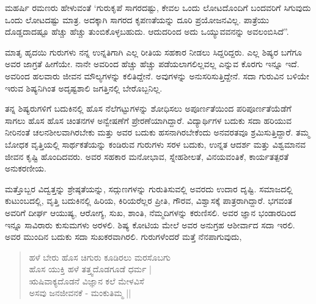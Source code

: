 ಮಹರ್ಷಿ ರಮಣರು ಹೇಳುವಂತೆ ‘ಗುರುಕೃಪೆ ಸಾಗರದಷ್ಟು, ಕೇವಲ ಒಂದು ಲೋಟದೊಂದಿಗೆ ಬಂದವರಿಗೆ ಸಿಗುವುದು ಒಂದು ಲೋಟದಷ್ಟು ಮಾತ್ರ. ಅದಕ್ಕಾಗಿ ಸಾಗರದ ಕೃಪಣತೆಯನ್ನು ದೂರಿ ಪ್ರಯೋಜನವಿಲ್ಲ. ಪಾತ್ರೆಯು ದೊಡ್ಡದಾದಷ್ಟೂ ಹೆಚ್ಚು ಹೆಚ್ಚು ತುಂಬಿಕೊಳ್ಳಬಹುದು. ಆದುದರಿಂದ ಅದು ಒಯ್ಯುವವನನ್ನು ಅವಲಂಬಿಸಿದೆ”.

ಮಾತೃ ಹೃದಯಿ ಗುರುಗಳು ನನ್ನ ಉನ್ನತಿಗಾಗಿ ಎಲ್ಲ ರೀತಿಯ ಸಹಕಾರ ನೀಡಲು ಸಿದ್ದರಿದ್ದರು. ಎಲ್ಲ ಶಿಷ್ಯರ ಬಗೆಗೂ ಅವರ ಜಾಗ್ರತೆ ಹೀಗೆಯೇ. ನಾನೇ ಅವರಿಂದ ಹೆಚ್ಚು ಹೆಚ್ಚು ಪಡೆಯಲಾಗಲಿಲ್ಲವಲ್ಲ ಎನ್ನುವ ಕೊರಗು ಇನ್ನೂ ಇದೆ. ಅವರಿಂದ ಹಲವಾರು ಜೀವನ ಮೌಲ್ಯಗಳನ್ನು ಕಲಿತಿದ್ದೇನೆ. ಅವುಗಳನ್ನು ಅನುಸರಿಸುತ್ತಿದ್ದೇನೆ. ಸದಾ ಗುರುವಿನ ಬಳಿಯೇ ಇರುವ ಶಿಷ್ಯನಿಗಿಂತ ಅದೃಷ್ಟಶಾಲಿ ಜಗತ್ತಿನಲ್ಲಿ ಬೇರೊಬ್ಬನಿಲ್ಲ.

ತನ್ನ ಶಿಷ್ಯರುಗಳಿಗೆ ಬದುಕಿನಲ್ಲಿ ಹೊಸ ನೆಲೆಗಟ್ಟುಗಳನ್ನು ಶೋಧಿಸಲು ಅಪೂರ್ಣತೆಯಿಂದ ಪರಿಪೂರ್ಣತೆಯೆಡೆಗೆ ಸಾಗಲು ಹೊಸ ಹೊಸ ಚಿಂತನಗಳ ಅನ್ವೇಷಣೆಗೆ ಪ್ರೇರಣೆಯಾಗಿದ್ದಾರೆ. ವಿದ್ಯಾರ್ಥಿಗಳ ಬದುಕು ಸದಾ ಹರಿಯುವ ನೀರಿನಂತೆ ಚಲನಶೀಲವಾಗಿರಬೇಕು ಮತ್ತು ಅವರ ಬದುಕು ಹಸನಾಗಿರಬೇಕೆಂದು ಅನವರತವೂ ಶ್ರಮಿಸುತ್ತಿದ್ದಾರೆ. ತಮ್ಮ ಬೋಧಕ ವೃತ್ತಿಯಲ್ಲಿ ಸಾರ್ಥಕತೆಯನ್ನು ಕಂಡಿರುವ ಗುರುಗಳು ಸರಳ ಬದುಕು, ಉನ್ನತ ಆದರ್ಶ ಮತ್ತು ವಿಶ್ವಮಾನವ ಜೀವನ ಕೃಷ್ಟಿ ಹೊಂದಿದವರು. ಅವರ ಸಹಕಾರ ಮನೋಭಾವ, ಸ್ನೇಹಶೀಲತೆ, ವಿನಯವಂತಿಕೆ, ಕಾರ್ಯತತ್ಪರತೆ ಅನುಕರಣೀಯ.

ಮತ್ತೊಬ್ಬರ ವಿದ್ವತ್ತನ್ನು ಶ್ರೇಷ್ಠತೆಯನ್ನು, ಸದ್ಗುಣಗಳನ್ನು ಗುರುತಿಸುವಲ್ಲಿ ಅವರದು ಉದಾರ ದೃಷ್ಟಿ. ಸಮಾಜದಲ್ಲಿ ಕುಟುಂಬದಲ್ಲಿ, ವೃತ್ತಿ ಬದುಕಿನಲ್ಲಿ ಹಿರಿಯ, ಕಿರಿಯರೆಲ್ಲರ ಪ್ರೀತಿ, ಗೌರವ, ವಿಶ್ವಾಸಕ್ಕೆ ಪಾತ್ರರಾಗಿದ್ದಾರೆ. ಭಗವಂತ ಅವರಿಗೆ ದೀರ್ಘ ಆಯುಷ್ಯ, ಆರೋಗ್ಯ, ಸುಖ, ಶಾಂತಿ, ನೆಮ್ಮದಿಗಳನ್ನು ಕರುಣಿಸಲಿ. ಅವರ ಜ್ಞಾನ ಭಂಡಾರದಿಂದ ಇನ್ನೂ ಸಾವಿರಾರು ಕುಸುಮಗಳು ಅರಳಲಿ. ಶಿಷ್ಯ ಕೋಟಿಯ ಮೇಲೆ ಅವರ ಅನುಗ್ರಹ ಆಶೀರ್ವಾದ ಸದಾ ಇರಲಿ. ಅವರ ಮುಂದಿನ ಬದುಕು ಸದಾ ಸುಖಕರವಾಗಿರಲಿ. ಗುರುಗಳೆಂದರೆ ಮತ್ತೆ ನೆನಪಾಗುವುದು,
\begin{verse}
ಹಳೆ ಬೇರು ಹೊಸ ಚಿಗುರು ಕೂಡಿರಲು ಮರಸೊಬಗು\\
ಹೊಸ ಯುಕ್ತಿ ಹಳೆ ತತ್ತ್ವದೊಡಗೂಡೆ ಧರ್ಮ |\\
ಋಷಿವಾಕ್ಯದೊಡನೆ ವಿಜ್ಞಾನ ಕಲೆ ಮೇಳವಿಸೆ \\
ಅಸವು ಜನಜೀವನಕೆ - ಮಂಕುತಿಮ್ಮ ||
\end{verse}
